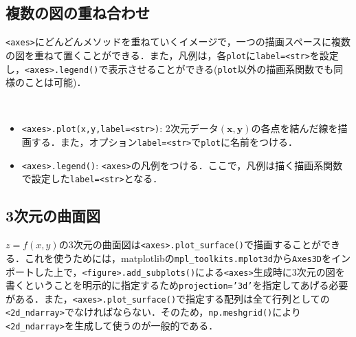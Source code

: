 \subsection{複数の図の重ね合わせ}

\texttt{<axes>}にどんどんメソッドを重ねていくイメージで，一つの描画スペースに複数の図を重ねて置くことができる．また，凡例は，各\texttt{plot}に\texttt{label=<str>}を設定し，\texttt{<axes>.legend()}で表示させることができる(\texttt{plot}以外の描画系関数でも同様のことは可能)．

\begin{gram}　
\begin{itemize}
\item \texttt{<axes>.plot(x,y,label=<str>)}: 2次元データ$(\bm{x},\bm{y})$の各点を結んだ線を描画する．また，オプション\texttt{label=<str>}で\texttt{plot}に名前をつける．
\item \texttt{<axes>.legend()}: \texttt{<axes>}の凡例をつける．ここで，凡例は描く描画系関数で設定した\texttt{label=<str>}となる．
\end{itemize}
\end{gram}

\begin{cod}[\texttt{fig6.py}]　
}]{code/fig6.py}
\vspace{-19pt}
\begin{figure}[H]
\begin{center}
\framed
\texttt{[image: code/fig6.eps]}
\vspace{-10pt}
\caption{\texttt{fig6.eps}}
\endframed
\end{center}
\end{figure}
\end{cod}
\vspace{-20pt}

\subsection{3次元の曲面図}

$z=f(x,y)$の3次元の曲面図は\texttt{<axes>.plot\_surface()}で描画することができる．これを使うためには，matplotlibの\texttt{mpl\_toolkits.mplot3d}から\texttt{Axes3D}をインポートした上で，\texttt{<figure>.add\_subplots()}による\texttt{<axes>}生成時に3次元の図を書くということを明示的に指定するため\texttt{projection='3d'}を指定してあげる必要がある．また，\texttt{<axes>.plot\_surface()}で指定する配列は全て行列としての\texttt{<2d\_ndarray>}でなければならない．そのため，\texttt{np.meshgrid()}により\texttt{<2d\_ndarray>}を生成して使うのが一般的である．

